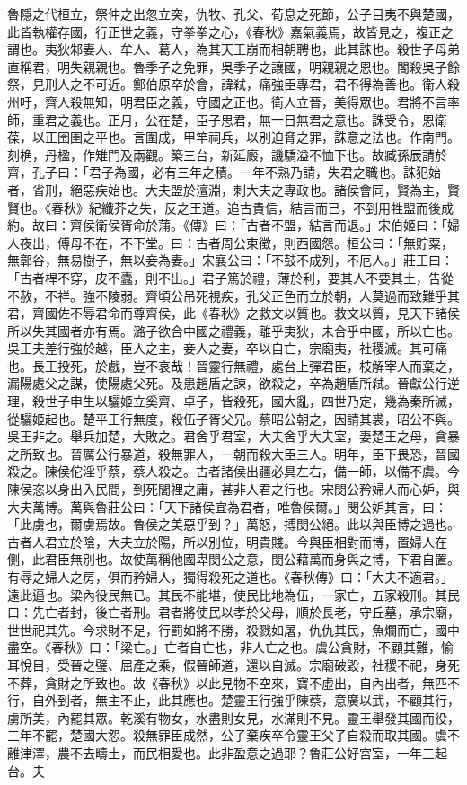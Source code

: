 魯隱之代桓立，祭仲之出忽立突，仇牧、孔父、荀息之死節，公子目夷不與楚國，此皆執權存國，行正世之義，守拳拳之心，《春秋》嘉氣義焉，故皆見之，複正之謂也。夷狄邾妻人、牟人、葛人，為其天王崩而相朝聘也，此其誅也。殺世子母弟直稱君，明失親親也。魯季子之免罪，吳季子之讓國，明親親之恩也。閽殺吳子餘祭，見刑人之不可近。鄭伯原卒於會，諱弒，痛強臣專君，君不得為善也。衛人殺州吁，齊人殺無知，明君臣之義，守國之正也。衛人立晉，美得眾也。君將不言率師，重君之義也。正月，公在楚，臣子思君，無一日無君之意也。誅受令，恩衛葆，以正囹圉之平也。言圍成，甲竿祠兵，以別迫脅之罪，誅意之法也。作南門。刻桷，丹楹，作雉門及兩觀。築三台，新延廄，譏驕溢不恤下也。故臧孫辰請於齊，孔子曰：「君子為國，必有三年之積。一年不熟乃請，失君之職也。誅犯始者，省刑，絕惡疾始也。大夫盟於澶淵，刺大夫之專政也。諸侯會同，賢為主，賢賢也。《春秋》紀纖芥之失，反之王道。追古貴信，結言而已，不到用牲盟而後成約。故曰：齊侯衛侯胥命於蒲。《傳》曰：「古者不盟，結言而退。」宋伯姬曰：「婦人夜出，傅母不在，不下堂。曰：古者周公東徵，則西國怨。桓公曰：「無貯粟，無鄣谷，無易樹子，無以妾為妻。」宋襄公曰：「不鼓不成列，不厄人。」莊王曰：「古者桿不穿，皮不蠹，則不出。」君子篤於禮，薄於利，要其人不要其土，告從不赦，不祥。強不陵弱。齊頃公吊死視疾，孔父正色而立於朝，人莫過而致難乎其君，齊國佐不辱君命而尊齊侯，此《春秋》之救文以質也。救文以質，見天下諸侯所以失其國者亦有焉。潞子欲合中國之禮義，離乎夷狄，未合乎中國，所以亡也。吳王夫差行強於越，臣人之主，妾人之妻，卒以自亡，宗廟夷，社稷滅。其可痛也。長王投死，於戲，豈不哀哉！晉靈行無禮，處台上彈君臣，枝解宰人而棄之，漏陽處父之謀，使陽處父死。及患趙盾之諫，欲殺之，卒為趙盾所弒。晉獻公行逆理，殺世子申生以驪姬立奚齊、卓子，皆殺死，國大亂，四世乃定，幾為秦所滅，從驪姬起也。楚平王行無度，殺伍子胥父兄。蔡昭公朝之，因請其裘，昭公不與。吳王非之。舉兵加楚，大敗之。君舍乎君室，大夫舍乎大夫室，妻楚王之母，貪暴之所致也。晉厲公行暴道，殺無罪人，一朝而殺大臣三人。明年，臣下畏恐，晉國殺之。陳侯佗淫乎蔡，蔡人殺之。古者諸侯出疆必具左右，備一師，以備不虞。今陳侯恣以身出入民間，到死閭裡之庸，甚非人君之行也。宋閔公矜婦人而心妒，與大夫萬博。萬與魯莊公曰：「天下諸侯宜為君者，唯魯侯爾。」閔公妒其言，曰：「此虜也，爾虜焉故。魯侯之美惡乎到？」萬怒，搏閔公絕。此以與臣博之過也。古者人君立於陰，大夫立於陽，所以別位，明貴賤。今與臣相對而博，置婦人在側，此君臣無別也。故使萬稱他國卑閔公之意，閔公藉萬而身與之博，下君自置。有辱之婦人之房，俱而矜婦人，獨得殺死之道也。《春秋傳》曰：「大夫不適君。」遠此逼也。梁內役民無已。其民不能堪，使民比地為伍，一家亡，五家殺刑。其民曰：先亡者封，後亡者刑。君者將使民以孝於父母，順於長老，守丘墓，承宗廟，世世祀其先。今求財不足，行罰如將不勝，殺戮如屠，仇仇其民，魚爛而亡，國中盡空。《春秋》曰：「梁亡。」亡者自亡也，非人亡之也。虞公貪財，不顧其難，愉耳悅目，受晉之璧、屈產之乘，假晉師道，還以自滅。宗廟破毀，社稷不祀，身死不葬，貪財之所致也。故《春秋》以此見物不空來，寶不虛出，自內出者，無匹不行，自外到者，無主不止，此其應也。楚靈王行強乎陳蔡，意廣以武，不顧其行，虜所美，內罷其眾。乾溪有物女，水盡則女見，水滿則不見。靈王舉發其國而役，三年不罷，楚國大怨。殺無罪臣成然，公子棄疾卒令靈王父子自殺而取其國。虞不離津澤，農不去疇土，而民相愛也。此非盈意之過耶？魯莊公好宮室，一年三起台。夫